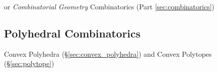 or \emph{Combinatorial Geometry} \fist Combinatorics (Part
\ref{sec:combinatorics})



\subsection{Polyhedral Combinatorics}\label{sec:polyhedral_combinatorics}

Convex Polyhedra (\S\ref{sec:convex_polyhedra}) and Convex Polytopes
(\S\ref{sec:polytope})
